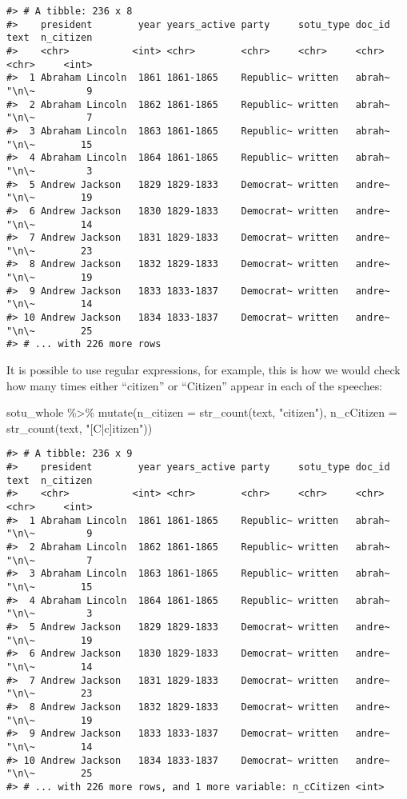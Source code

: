 \documentclass[
]{book}
\newenvironment{Shaded}{\begin{snugshade}}{\end{snugshade}}
\newcommand{\AttributeTok}[1]{\textcolor[rgb]{0.77,0.63,0.00}{#1}}
\newcommand{\FunctionTok}[1]{\textcolor[rgb]{0.00,0.00,0.00}{#1}}
\newcommand{\NormalTok}[1]{#1}
\newcommand{\SpecialCharTok}[1]{\textcolor[rgb]{0.00,0.00,0.00}{#1}}
\newcommand{\StringTok}[1]{\textcolor[rgb]{0.31,0.60,0.02}{#1}}
\begin{document}
\begin{verbatim}
#> # A tibble: 236 x 8
#>    president        year years_active party     sotu_type doc_id text  n_citizen
#>    <chr>           <int> <chr>        <chr>     <chr>     <chr>  <chr>     <int>
#>  1 Abraham Lincoln  1861 1861-1865    Republic~ written   abrah~ "\n\~         9
#>  2 Abraham Lincoln  1862 1861-1865    Republic~ written   abrah~ "\n\~         7
#>  3 Abraham Lincoln  1863 1861-1865    Republic~ written   abrah~ "\n\~        15
#>  4 Abraham Lincoln  1864 1861-1865    Republic~ written   abrah~ "\n\~         3
#>  5 Andrew Jackson   1829 1829-1833    Democrat~ written   andre~ "\n\~        19
#>  6 Andrew Jackson   1830 1829-1833    Democrat~ written   andre~ "\n\~        14
#>  7 Andrew Jackson   1831 1829-1833    Democrat~ written   andre~ "\n\~        23
#>  8 Andrew Jackson   1832 1829-1833    Democrat~ written   andre~ "\n\~        19
#>  9 Andrew Jackson   1833 1833-1837    Democrat~ written   andre~ "\n\~        14
#> 10 Andrew Jackson   1834 1833-1837    Democrat~ written   andre~ "\n\~        25
#> # ... with 226 more rows
\end{verbatim}

It is possible to use regular expressions, for example, this is how we would check how many times either ``citizen'' or ``Citizen'' appear in each of the speeches:

\begin{Shaded}
\begin{Highlighting}[]
\NormalTok{sotu\_whole }\SpecialCharTok{\%\textgreater{}\%} 
    \FunctionTok{mutate}\NormalTok{(}\AttributeTok{n\_citizen =} \FunctionTok{str\_count}\NormalTok{(text, }\StringTok{"citizen"}\NormalTok{),}
           \AttributeTok{n\_cCitizen =} \FunctionTok{str\_count}\NormalTok{(text, }\StringTok{"[C|c]itizen"}\NormalTok{)) }
\end{Highlighting}
\end{Shaded}

\begin{verbatim}
#> # A tibble: 236 x 9
#>    president        year years_active party     sotu_type doc_id text  n_citizen
#>    <chr>           <int> <chr>        <chr>     <chr>     <chr>  <chr>     <int>
#>  1 Abraham Lincoln  1861 1861-1865    Republic~ written   abrah~ "\n\~         9
#>  2 Abraham Lincoln  1862 1861-1865    Republic~ written   abrah~ "\n\~         7
#>  3 Abraham Lincoln  1863 1861-1865    Republic~ written   abrah~ "\n\~        15
#>  4 Abraham Lincoln  1864 1861-1865    Republic~ written   abrah~ "\n\~         3
#>  5 Andrew Jackson   1829 1829-1833    Democrat~ written   andre~ "\n\~        19
#>  6 Andrew Jackson   1830 1829-1833    Democrat~ written   andre~ "\n\~        14
#>  7 Andrew Jackson   1831 1829-1833    Democrat~ written   andre~ "\n\~        23
#>  8 Andrew Jackson   1832 1829-1833    Democrat~ written   andre~ "\n\~        19
#>  9 Andrew Jackson   1833 1833-1837    Democrat~ written   andre~ "\n\~        14
#> 10 Andrew Jackson   1834 1833-1837    Democrat~ written   andre~ "\n\~        25
#> # ... with 226 more rows, and 1 more variable: n_cCitizen <int>
\end{verbatim}
\end{document}
